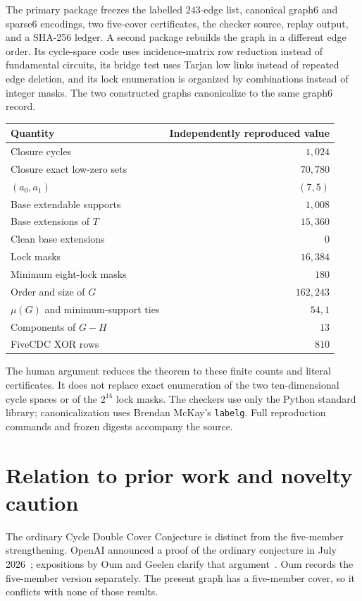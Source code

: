 \documentclass[11pt]{article}
\theoremstyle{definition}
\theoremstyle{remark}
\begin{document}
The primary package freezes the labelled \(243\)-edge list, canonical
graph6 and sparse6 encodings, two five-cover certificates, the checker
source, replay output, and a SHA-256 ledger.  A second package rebuilds
the graph in a different edge order.  Its cycle-space code uses
incidence-matrix row reduction instead of fundamental circuits, its
bridge test uses Tarjan low links instead of repeated edge deletion, and
its lock enumeration is organized by combinations instead of integer
masks.  The two constructed graphs canonicalize to the same graph6
record.

\begin{center}
\begin{tabular}{@{}lr@{}}
\toprule
Quantity & Independently reproduced value\\
\midrule
Closure cycles & \(1{,}024\)\\
Closure exact low-zero sets & \(70{,}780\)\\
\((a_0,a_1)\) & \((7,5)\)\\
Base extendable supports & \(1{,}008\)\\
Base extensions of \(T\) & \(15{,}360\)\\
Clean base extensions & \(0\)\\
Lock masks & \(16{,}384\)\\
Minimum eight-lock masks & \(180\)\\
Order and size of \(G\) & \(162,243\)\\
\(\mu(G)\) and minimum-support ties & \(54,1\)\\
Components of \(G-H\) & \(13\)\\
FiveCDC XOR rows & \(810\)\\
\bottomrule
\end{tabular}
\end{center}

The human argument reduces the theorem to these finite counts and
literal certificates.  It does not replace exact enumeration of the two
ten-dimensional cycle spaces or of the \(2^{14}\) lock masks.  The
checkers use only the Python standard library; canonicalization uses
Brendan McKay's \texttt{labelg}.  Full reproduction commands and frozen
digests accompany the source.

\section{Relation to prior work and novelty caution}

The ordinary Cycle Double Cover Conjecture is distinct from the
five-member strengthening.  OpenAI announced a proof of the ordinary
conjecture in July 2026~\cite{OpenAI2026CDC}; expositions by Oum and
Geelen clarify that argument~\cite{Oum2026CDC,Geelen2026CDC}.  Oum
records the five-member version separately.  The present graph has a
five-member cover, so it conflicts with none of those results.
\end{document}
